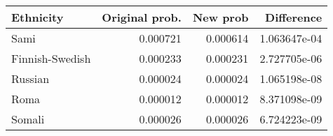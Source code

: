 \begin{tabular}{lrrr}
\toprule
      Ethnicity &  Original prob. &  New prob &   Difference \\
\midrule
           Sami &        0.000721 &  0.000614 & 1.063647e-04 \\
Finnish-Swedish &        0.000233 &  0.000231 & 2.727705e-06 \\
        Russian &        0.000024 &  0.000024 & 1.065198e-08 \\
           Roma &        0.000012 &  0.000012 & 8.371098e-09 \\
         Somali &        0.000026 &  0.000026 & 6.724223e-09 \\
\bottomrule
\end{tabular}
